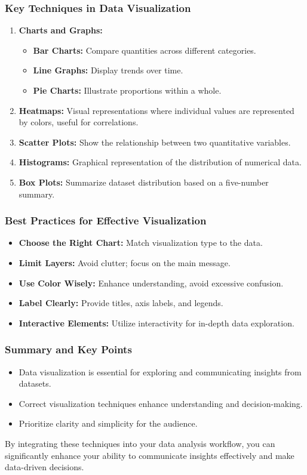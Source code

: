 \documentclass[aspectratio=169]{beamer}
\begin{document}
\begin{frame}[fragile]
    \frametitle{Key Techniques in Data Visualization}
    \begin{enumerate}
        \item \textbf{Charts and Graphs:}
            \begin{itemize}
                \item \textbf{Bar Charts:} Compare quantities across different categories. 
                \item \textbf{Line Graphs:} Display trends over time. 
                \item \textbf{Pie Charts:} Illustrate proportions within a whole. 
            \end{itemize}
        \item \textbf{Heatmaps:} Visual representations where individual values are represented by colors, useful for correlations.
        \item \textbf{Scatter Plots:} Show the relationship between two quantitative variables.
        \item \textbf{Histograms:} Graphical representation of the distribution of numerical data.
        \item \textbf{Box Plots:} Summarize dataset distribution based on a five-number summary.
    \end{enumerate}
\end{frame}

\begin{frame}[fragile]
    \frametitle{Best Practices for Effective Visualization}
    \begin{itemize}
        \item \textbf{Choose the Right Chart:} Match visualization type to the data.
        \item \textbf{Limit Layers:} Avoid clutter; focus on the main message.
        \item \textbf{Use Color Wisely:} Enhance understanding, avoid excessive confusion.
        \item \textbf{Label Clearly:} Provide titles, axis labels, and legends.
        \item \textbf{Interactive Elements:} Utilize interactivity for in-depth data exploration.
    \end{itemize}
\end{frame}

\begin{frame}[fragile]
    \frametitle{Summary and Key Points}
    \begin{itemize}
        \item Data visualization is essential for exploring and communicating insights from datasets.
        \item Correct visualization techniques enhance understanding and decision-making.
        \item Prioritize clarity and simplicity for the audience.
    \end{itemize}
    By integrating these techniques into your data analysis workflow, you can significantly enhance your ability to communicate insights effectively and make data-driven decisions.
\end{frame}
\end{document}
